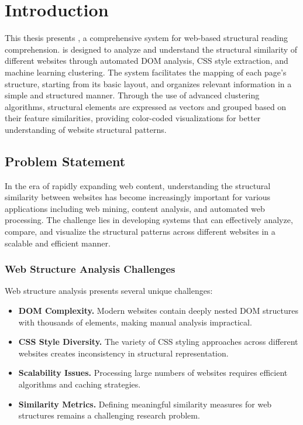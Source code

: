 \chapter{Introduction}
\label{chap:introduction}

This thesis presents {\name}, a comprehensive system for web-based structural reading comprehension. {\name} is designed to analyze and understand the structural similarity of different websites through automated DOM analysis, CSS style extraction, and machine learning clustering. The system facilitates the mapping of each page's structure, starting from its basic layout, and organizes relevant information in a simple and structured manner. Through the use of advanced clustering algorithms, structural elements are expressed as vectors and grouped based on their feature similarities, providing color-coded visualizations for better understanding of website structural patterns.

\section{Problem Statement}
\label{sec:problem_statement}

In the era of rapidly expanding web content, understanding the structural similarity between websites has become increasingly important for various applications including web mining, content analysis, and automated web processing. The challenge lies in developing systems that can effectively analyze, compare, and visualize the structural patterns across different websites in a scalable and efficient manner.

\subsection{Web Structure Analysis Challenges}

Web structure analysis presents several unique challenges:

\begin{itemize}
\item \textbf{DOM Complexity.} Modern websites contain deeply nested DOM structures with thousands of elements, making manual analysis impractical.
\item \textbf{CSS Style Diversity.} The variety of CSS styling approaches across different websites creates inconsistency in structural representation.
\item \textbf{Scalability Issues.} Processing large numbers of websites requires efficient algorithms and caching strategies.
\item \textbf{Similarity Metrics.} Defining meaningful similarity measures for web structures remains a challenging research problem.
\end{itemize}

